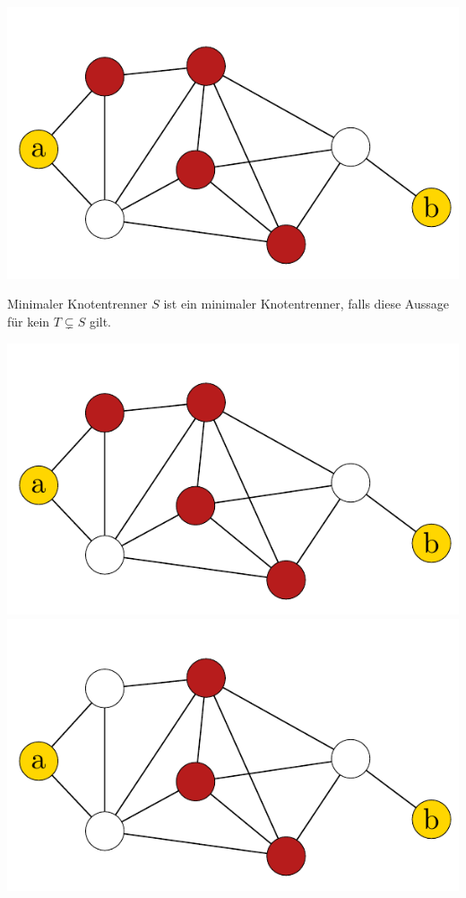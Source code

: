 \documentclass[xcolor=x11names,compress]{beamer}
\begin{document}
\begin{frame}
\begin{center}
\begin{overprint}
			\includegraphics[scale=1.0]{img/graph/nodeseparator/04.pdf}
		\end{overprint}
	\end{center}
\end{frame}

\begin{frame}
	\begin{block}{Minimaler Knotentrenner}
		\( S \) ist ein minimaler Knotentrenner, falls diese Aussage für kein \( T \subsetneq S \) gilt.
	\end{block}
	\begin{center}
		\begin{overprint}
			\includegraphics[scale=1.0]{img/graph/nodeseparator/04.pdf}
			\onslide<2>\includegraphics[scale=1.0]{img/graph/nodeseparator/05.pdf}
		\end{overprint}
	\end{center}
\end{frame}
\end{document}
